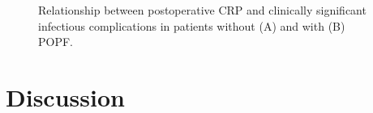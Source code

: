 \begin{figure}[htbp]
	\caption{Relationship between postoperative CRP and clinically significant infectious complications in patients without (A) and with (B) POPF.}
	\label{fig:crp_comp_infectious_leak}
	
\end{figure}




\clearpage
\section{Discussion}